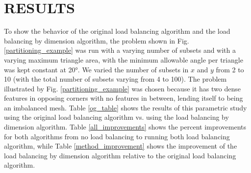 \documentclass[letterpaper]{mandc2019}
\begin{document}
{\FloatBarrier
\section{RESULTS}

To show the behavior of the original load balancing algorithm and the load balancing by dimension algorithm, the problem shown in Fig. \ref{partitioning_example} was run with a varying number of subsets and with a varying maximum triangle area, with the minimum allowable angle per triangle was kept constant at \ang{20}. We varied the number of subsets in $x$ and $y$ from 2 to 10 (with the total number of subsets varying from 4 to 100). The problem illustrated by Fig. \ref{partitioning_example} was chosen because it has two dense features in opposing corners with no features in between, lending itself to being an imbalanced mesh. Table \ref{og_table} shows the results of this parametric study using the original load balancing algorithm vs. using the load balancing by dimension algorithm. Table \ref{all_improvements} shows the percent improvements for both algorithms from no load balancing to running both load balancing algorithm, while Table \ref{method_improvement} shows the improvement of the load balancing by dimension algorithm relative to the original load balancing algorithm.

}
\end{document}
